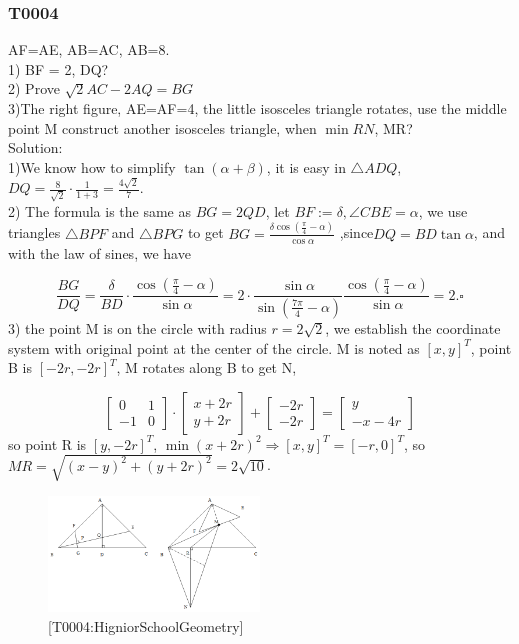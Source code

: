 \documentclass[UTF8]{article}
\begin{document}
\subsubsection{T0004}
AF=AE, AB=AC, AB=8. \\
1) BF = 2, DQ? \\
2) Prove $\sqrt 2AC - 2 AQ = BG$\\
3)The right figure, AE=AF=4, the little isosceles triangle rotates, use the middle point M construct another isosceles triangle, when $\min RN$, MR?\\
Solution:\\
1)We know how to simplify $\tan {(\alpha + \beta)}$, it is easy in $\bigtriangleup ADQ$, $DQ = \frac{8}{\sqrt2} \cdot \frac{1}{1+3}= \frac{4\sqrt 2}{7}$.\\
2) The formula is the same as $BG=2QD$, let $BF:=\delta, \angle CBE = \alpha$, we use triangles $\bigtriangleup BPF$ and  $\bigtriangleup BPG$ to get $BG = \frac{\delta \cos(\frac{\pi}{4}-\alpha)}{\cos \alpha}$ ,since$DQ = BD\tan \alpha$, and with the law of sines, we have 

\begin{equation}
 \frac{BG}{DQ} = \frac{\delta}{BD} \cdot \frac{\cos(\frac{\pi}{4}-\alpha)}{\sin \alpha} = 2 \cdot \frac{\sin \alpha}{\sin(\frac{7\pi}{4}-\alpha)}\frac{\cos(\frac{\pi}{4}-\alpha)}{\sin \alpha} =2. \square 
\end{equation}
3) the point M is on the circle with radius $r = 2\sqrt 2$, we establish the coordinate system with original point at the center of the circle. M is noted as $[x,y]^T$, point B is  $[-2r, -2r]^T$, M rotates along B to get N, 

\begin{equation}
    \begin{bmatrix}
        0 &1\\
        -1 & 0
    \end{bmatrix}
    \cdot     
    \begin{bmatrix}
        x+2r\\
        y+2r
    \end{bmatrix}
    + 
    \begin{bmatrix}
        -2r\\
        -2r
    \end{bmatrix}
    = 
    \begin{bmatrix}
        y\\
        -x-4r
    \end{bmatrix}
\end{equation}
so point R is $[y,-2r]^T$, $\min (x+2r)^2 \Rightarrow [x,y]^T = [-r,0]^T$, so $MR = \sqrt{(x-y)^2 + (y+2r)^2} = 2\sqrt {10}$.

\begin{figure}[h]
    \centering
    \includegraphics[width=0.5\textwidth]{../../resources/T0005_20211219_HigniorSchoolGeometry.png}
    \caption{[T0004:HigniorSchoolGeometry]}
    \label{fig:4}
\end{figure}
\end{document}
